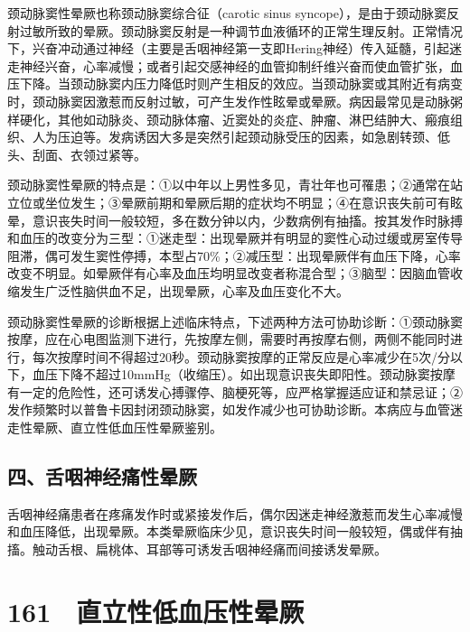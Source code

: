 颈动脉窦性晕厥也称颈动脉窦综合征（carotic sinus
syncope），是由于颈动脉窦反射过敏所致的晕厥。颈动脉窦反射是一种调节血液循环的正常生理反射。正常情况下，兴奋冲动通过神经（主要是舌咽神经第一支即Hering神经）传入延髓，引起迷走神经兴奋，心率减慢；或者引起交感神经的血管抑制纤维兴奋而使血管扩张，血压下降。当颈动脉窦内压力降低时则产生相反的效应。当颈动脉窦或其附近有病变时，颈动脉窦因激惹而反射过敏，可产生发作性眩晕或晕厥。病因最常见是动脉粥样硬化，其他如动脉炎、颈动脉体瘤、近窦处的炎症、肿瘤、淋巴结肿大、瘢痕组织、人为压迫等。发病诱因大多是突然引起颈动脉受压的因素，如急剧转颈、低头、刮面、衣领过紧等。

颈动脉窦性晕厥的特点是：①以中年以上男性多见，青壮年也可罹患；②通常在站立位或坐位发生；③晕厥前期和晕厥后期的症状均不明显；④在意识丧失前可有眩晕，意识丧失时间一般较短，多在数分钟以内，少数病例有抽搐。按其发作时脉搏和血压的改变分为三型：①迷走型：出现晕厥并有明显的窦性心动过缓或房室传导阻滞，偶可发生窦性停搏，本型占70\%；②减压型：出现晕厥伴有血压下降，心率改变不明显。如晕厥伴有心率及血压均明显改变者称混合型；③脑型：因脑血管收缩发生广泛性脑供血不足，出现晕厥，心率及血压变化不大。

颈动脉窦性晕厥的诊断根据上述临床特点，下述两种方法可协助诊断：①颈动脉窦按摩，应在心电图监测下进行，先按摩左侧，需要时再按摩右侧，两侧不能同时进行，每次按摩时间不得超过20秒。颈动脉窦按摩的正常反应是心率减少在5次/分以下，血压下降不超过10mmHg（收缩压）。如出现意识丧失即阳性。颈动脉窦按摩有一定的危险性，还可诱发心搏骤停、脑梗死等，应严格掌握适应证和禁忌证；②发作频繁时以普鲁卡因封闭颈动脉窦，如发作减少也可协助诊断。本病应与血管迷走性晕厥、直立性低血压性晕厥鉴别。

\subsection{四、舌咽神经痛性晕厥}

舌咽神经痛患者在疼痛发作时或紧接发作后，偶尔因迷走神经激惹而发生心率减慢和血压降低，出现晕厥。本类晕厥临床少见，意识丧失时间一般较短，偶或伴有抽搐。触动舌根、扁桃体、耳部等可诱发舌咽神经痛而间接诱发晕厥。

\protect\hypertarget{text00366.html}{}{}

\section{161　直立性低血压性晕厥}

